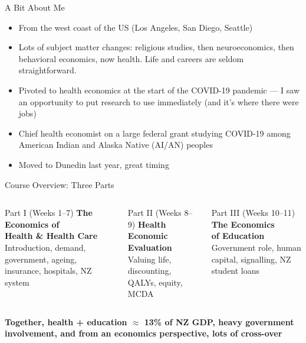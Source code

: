 \documentclass[aspectratio=169, 12pt]{beamer}
\begin{document}
\begin{frame}{A Bit About Me}
  \begin{itemize}
    \item From the west coast of the US (Los Angeles, San Diego, Seattle)
    \item Lots of subject matter changes: religious studies, then neuroeconomics, then
          behavioral economics, now health. Life and careers are seldom straightforward.
    \item Pivoted to health economics at the start of the COVID-19 pandemic ---
          I saw an opportunity to put research to use immediately (and it's where there were jobs)
    \item Chief health economist on a large federal grant studying COVID-19 among
          American Indian and Alaska Native (AI/AN) peoples
    \item Moved to Dunedin last year, great timing
  \end{itemize}
\end{frame}

\begin{frame}{Course Overview: Three Parts}
  \begin{columns}
      \begin{block}{Part I (Weeks 1--7)}
        \textbf{The Economics of\\Health \& Health Care}\\[0.4em]
        {\small Introduction, demand, government, ageing, insurance, hospitals, NZ system}
      \end{block}
      \begin{block}{Part II (Weeks 8--9)}
        \textbf{Health Economic\\Evaluation}\\[0.4em]
        {\small Valuing life, discounting, QALYs, equity, MCDA}
      \end{block}
      \begin{block}{Part III (Weeks 10--11)}
        \textbf{The Economics\\of Education}\\[0.4em]
        {\small Government role, human capital, signalling, NZ student loans}
      \end{block}
  \end{columns}
  \vspace{0.6em}
  \begin{center}
    \textbf{Together, health + education $\approx$ 13\% of NZ GDP, heavy government
    involvement, and from an economics perspective, lots of cross-over}
  \end{center}
\end{frame}
\end{document}
